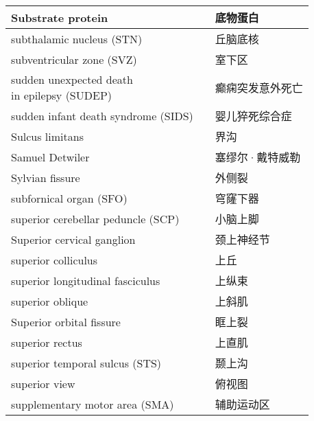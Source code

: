 \begin{longtable}{lll}
	\midrule
	Substrate protein  && 底物蛋白 \\
	
	\midrule
	subthalamic nucleus (STN)   && 丘脑底核 \\
	
	\midrule
	subventricular zone (SVZ)   && 室下区 \\
	
	\midrule
	\makecell[l]{sudden unexpected death \\in epilepsy (SUDEP)}  && 癫痫突发意外死亡 \\
	
	\midrule
	sudden infant death syndrome (SIDS)  && 婴儿猝死综合症 \\
	
	\midrule
	Sulcus limitans   && 界沟 \\
	
	\midrule
	Samuel Detwiler   && 塞缪尔·戴特威勒 \\
	
	\midrule
	Sylvian fissure   && 外侧裂 \\
	
	\midrule
	subfornical organ (SFO)  && 穹窿下器 \\
	
	\midrule
	superior cerebellar peduncle (SCP)  && 小脑上脚 \\
	
	\midrule
	Superior cervical ganglion   && 颈上神经节 \\
	
	\midrule
	superior colliculus   && 上丘 \\
	
	\midrule
	superior longitudinal fasciculus   && 上纵束 \\
	
	\midrule
	superior oblique   && 上斜肌 \\
	
	\midrule
	Superior orbital fissure   && 眶上裂 \\
	
	\midrule
	superior rectus   && 上直肌 \\
	
	\midrule
	superior temporal sulcus (STS)   && 颞上沟 \\
	
	\midrule
	superior view   && 俯视图 \\
	
	\midrule
	supplementary motor area (SMA)   && 辅助运动区 \\
	

\end{longtable}
